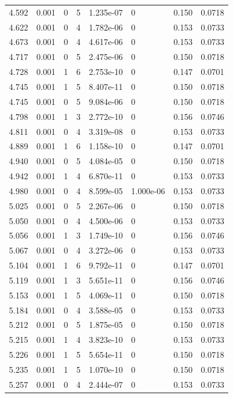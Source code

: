 \documentclass[preview]{standalone}
\begin{document}
{{{{\begin{tabular}{L{1.2cm}C{1.2cm} C{0.3cm}C{0.5cm} C{1.4cm}C{1.4cm} C{1.4cm}C{1.4cm}}
  4.592  &  0.001  & 0     &  5 &  1.235e-07  & 0  & 0.150 &  0.0718   \\ 
  4.622  &  0.001  & 0     &  4 &  1.782e-06  & 0  & 0.153 &  0.0733   \\ 
  4.673  &  0.001  & 0     &  4 &  4.617e-06  & 0  & 0.153 &  0.0733   \\ 
  4.717  &  0.001  & 0     &  5 &  2.475e-06  & 0  & 0.150 &  0.0718   \\ 
  4.728  &  0.001  & 1     &  6 &  2.753e-10  & 0  & 0.147 &  0.0701   \\ 
  4.745  &  0.001  & 1     &  5 &  8.407e-11  & 0  & 0.150 &  0.0718   \\ 
  4.745  &  0.001  & 0     &  5 &  9.084e-06  & 0  & 0.150 &  0.0718   \\ 
  4.798  &  0.001  & 1     &  3 &  2.772e-10  & 0  & 0.156 &  0.0746   \\ 
  4.811  &  0.001  & 0     &  4 &  3.319e-08  & 0  & 0.153 &  0.0733   \\ 
  4.889  &  0.001  & 1     &  6 &  1.158e-10  & 0  & 0.147 &  0.0701   \\ 
  4.940  &  0.001  & 0     &  5 &  4.084e-05  & 0  & 0.150 &  0.0718   \\ 
  4.942  &  0.001  & 1     &  4 &  6.870e-11  & 0  & 0.153 &  0.0733   \\ 
  4.980  &  0.001  & 0     &  4 &  8.599e-05  & 1.000e-06  & 0.153 &  0.0733   \\ 
  5.025  &  0.001  & 0     &  5 &  2.267e-06  & 0  & 0.150 &  0.0718   \\ 
  5.050  &  0.001  & 0     &  4 &  4.500e-06  & 0  & 0.153 &  0.0733   \\ 
  5.056  &  0.001  & 1     &  3 &  1.749e-10  & 0  & 0.156 &  0.0746   \\ 
  5.067  &  0.001  & 0     &  4 &  3.272e-06  & 0  & 0.153 &  0.0733   \\ 
  5.104  &  0.001  & 1     &  6 &  9.792e-11  & 0  & 0.147 &  0.0701   \\ 
  5.119  &  0.001  & 1     &  3 &  5.651e-11  & 0  & 0.156 &  0.0746   \\ 
  5.153  &  0.001  & 1     &  5 &  4.069e-11  & 0  & 0.150 &  0.0718   \\ 
  5.184  &  0.001  & 0     &  4 &  3.588e-05  & 0  & 0.153 &  0.0733   \\ 
  5.212  &  0.001  & 0     &  5 &  1.875e-05  & 0  & 0.150 &  0.0718   \\ 
  5.215  &  0.001  & 1     &  4 &  3.823e-10  & 0  & 0.153 &  0.0733   \\ 
  5.226  &  0.001  & 1     &  5 &  5.654e-11  & 0  & 0.150 &  0.0718   \\ 
  5.235  &  0.001  & 1     &  5 &  1.070e-10  & 0  & 0.150 &  0.0718   \\ 
  5.257  &  0.001  & 0     &  4 &  2.444e-07  & 0  & 0.153 &  0.0733   \\ 
\hline 
\end{tabular} 

}}}}
\end{document}
